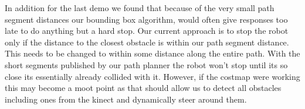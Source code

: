 In addition for the last demo we found that because of the very small path segment distances our bounding box algorithm, would often give responses too late to do anything but a hard stop. Our current approach is to stop the robot only if the distance to the closest obstacle is within our path segment distance. This needs to be changed to within some distance along the entire path. With the short segments published by our path planner the robot won't stop until its so close its essentially already collided with it. However, if the costmap were working this may become a moot point as that should allow us to detect all obstacles including ones from the kinect and dynamically steer around them.






